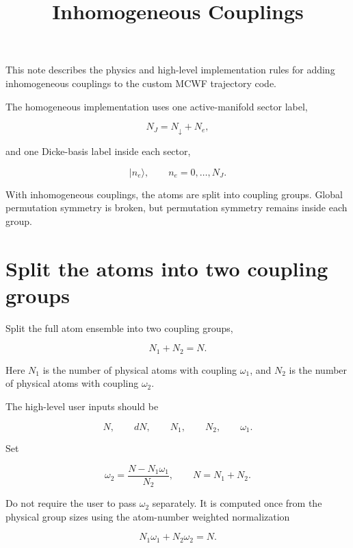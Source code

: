\documentclass[11pt]{article}
\title{Inhomogeneous Couplings}
\author{}
\date{}
\begin{document}
\maketitle

This note describes the physics and high-level implementation rules for adding
inhomogeneous couplings to the custom MCWF trajectory code.

The homogeneous implementation uses one active-manifold sector label,

\begin{equation}
N_J=N_\downarrow+N_e,
\end{equation}

and one Dicke-basis label inside each sector,

\begin{equation}
|n_e\rangle,
\qquad
n_e=0,\dots,N_J.
\end{equation}

With inhomogeneous couplings, the atoms are split into coupling groups. Global
permutation symmetry is broken, but permutation symmetry remains inside each
group.

\section*{Split the atoms into two coupling groups}

Split the full atom ensemble into two coupling groups,

\begin{equation}
N_1+N_2=N.
\end{equation}

Here \(N_1\) is the number of physical atoms with coupling \(\omega_1\), and
\(N_2\) is the number of physical atoms with coupling \(\omega_2\).

The high-level user inputs should be

\begin{equation}
N,
\qquad
dN,
\qquad
N_1,
\qquad
N_2,
\qquad
\omega_1.
\end{equation}

Set

\begin{equation}
\omega_2
=
\frac{N-N_1\omega_1}{N_2},
\qquad
N=N_1+N_2.
\end{equation}

Do not require the user to pass \(\omega_2\) separately. It is computed once
from the physical group sizes using the atom-number weighted normalization

\begin{equation}
N_1\omega_1+N_2\omega_2=N.
\end{equation}
\end{document}
